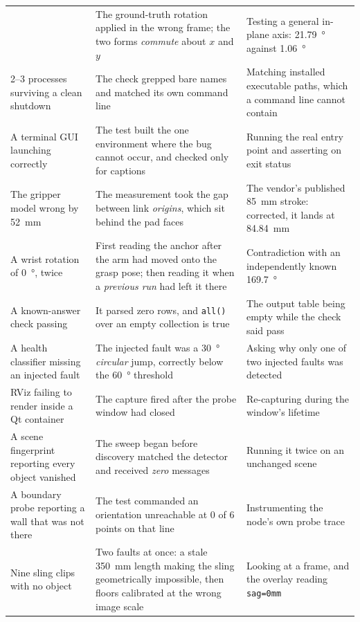 \begin{table}[htbp]
\begin{tabular}{@{}p{32mm}p{45mm}p{45mm}@{}}
      & The ground-truth rotation applied in the wrong frame; the two forms
        \emph{commute} about $x$ and $y$
      & Testing a general in-plane axis: \SI{21.79}{\degree} against
        \SI{1.06}{\degree} \\
    2--3 processes surviving a clean shutdown
      & The check grepped bare names and matched its own command line
      & Matching installed executable paths, which a command line cannot
        contain \\
    A terminal GUI launching correctly
      & The test built the one environment where the bug cannot occur, and
        checked only for captions
      & Running the real entry point and asserting on exit status \\
    \midrule
    The gripper model wrong by \SI{52}{\milli\metre}
      & The measurement took the gap between link \emph{origins}, which sit
        behind the pad faces
      & The vendor's published \SI{85}{\milli\metre} stroke: corrected, it
        lands at \SI{84.84}{\milli\metre} \\
    A wrist rotation of \SI{0}{\degree}, twice
      & First reading the anchor after the arm had moved onto the grasp pose;
        then reading it when a \emph{previous run} had left it there
      & Contradiction with an independently known \SI{169.7}{\degree} \\
    A known-answer check passing
      & It parsed zero rows, and \texttt{all()} over an empty collection is
        true
      & The output table being empty while the check said pass \\
    A health classifier missing an injected fault
      & The injected fault was a \SI{30}{\degree} \emph{circular} jump,
        correctly below the \SI{60}{\degree} threshold
      & Asking why only one of two injected faults was detected \\
    {RViz} failing to render inside a {Qt} container
      & The capture fired after the probe window had closed
      & Re-capturing during the window's lifetime \\
    A scene fingerprint reporting every object vanished
      & The sweep began before discovery matched the detector and received
        \emph{zero} messages
      & Running it twice on an unchanged scene \\
    A boundary probe reporting a wall that was not there
      & The test commanded an orientation unreachable at 0 of 6 points on that
        line
      & Instrumenting the node's own probe trace \\
    Nine sling clips with no object
      & Two faults at once: a stale \SI{350}{\milli\metre} length making the
        sling geometrically impossible, then floors calibrated at the wrong
        image scale
      & Looking at a frame, and the overlay reading \texttt{sag=0mm} \\
    \bottomrule
  \end{tabular}
\end{table}

